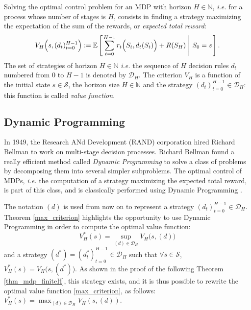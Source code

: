 Solving the optimal control problem
for an MDP with horizon $H \in \mathbb{N}$,
\textit{i.e.} for a process whose number of stages is $H$,
consists in finding a strategy maximizing 
the expectation of the sum of the rewards, 
or \textit{expected total reward}: 
\begin{equation} 
\label{criterion} 
V_H \Big( s,(d_t)_{t=0}^{ H-1 } \Big) 
:= \mathbb{E} \left[ \left.  \sum_{t=0}^{H-1} r_t \Big( S_t,d_t(S_t) \Big) + R(S_H) \, \right| \left. \, S_0=s  \right. \right].
\end{equation} 
The set of strategies of horizon $H \in \mathbb{N}$ 
\textit{i.e.} the sequence of $H$ decision rules $d_t$
numbered from $0$ to $H-1$ is denoted by $\mathcal{D}_H$.
The criterion $V_H$ is a function of the initial state $s \in \mathcal{S}$, 
the horizon size $H \in \mathbb{N}$ 
and the strategy $(d_t)_{t=0}^{H-1} \in \mathcal{D}_H$: 
this function is called \textit{value function}. 
\subsection{Dynamic Programming}
\label{subsectionDP}
In 1949, the Research ANd Development (RAND) corporation 
hired Richard Bellman to work on multi-stage decision processes.
Richard Bellman found a really efficient method
called \textit{Dynamic Programming} \cite{bellman54}
to solve a class of problems by decomposing them 
into several simpler subproblems.
The optimal control of MDPs,
\textit{i.e.} the computation of a strategy
maximizing the expected total reward, is part of this class,
and is classically performed using Dynamic Programming \cite{puterman94}.

The notation $(d)$ is used from now on
to represent a strategy $(d_t)_{t=0}^{H-1} \in \mathcal{D}_H$.
Theorem \ref{max_criterion} highlights the opportunity 
to use Dynamic Programming 
in order to compute the optimal value function:
\begin{equation}
\label{max_criterion} 
V^*_H(s)= \sup_{(d) \in \mathcal{D}_H}  V_H \Big( s,(d) \Big) 
\end{equation}
and a strategy $(d^*) = (d^*_t)_{t=0}^{H-1} \in \mathcal{D}_H$ 
such that $\forall s \in \mathcal{S}$, 
$V_H^*(s) = V_H \Big(s,(d^*)\Big)$.
As shown in the proof of the following Theorem \ref{thm_mdp_finiteH}, 
this strategy exists, and
it is thus possible to rewrite the optimal value function \ref{max_criterion},
as follows: $\displaystyle V^*_H(s)= \max_{(d) \in \mathcal{D}_H}  V_H(s,(d))$.  

